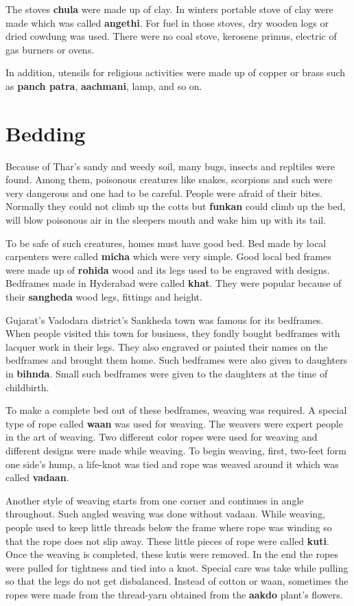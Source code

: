 The stoves \textbf{chula} were made up of clay. In winters portable stove of
clay were made which was called \textbf{angethi}. For fuel in those stoves, dry
wooden logs or dried cowdung was used. There were no coal stove, kerosene
primus, electric of gas burners or ovens.

In addition, utensils for religious activities were made up of copper or brass
such as \textbf{panch patra}, \textbf{aachmani}, lamp, and so on.

\section{Bedding}
Because of Thar's sandy and weedy soil, many bugs, insects and repltiles were
found. Among them, poisonous creatures like snakes, scorpions and such were very
dangerous and one had to be careful. People were afraid of their bites. Normally
they could not climb up the cotts but \textbf{funkan} could climb up the bed,
will blow poisonous air in the sleepers mouth and wake him up with its tail.

To be safe of such creatures, homes must have good bed. Bed made by local
carpenters were called \textbf{micha} which were very simple. Good local bed
frames were made up of \textbf{rohida} wood and its legs used to be engraved with
designs. Bedframes made in Hyderabad were called \textbf{khat}. They were popular
because of their \textbf{sangheda} wood legs, fittings and height.

Gujarat's Vadodara district's Sankheda town was famous for its bedframes. When
people visited this town for business, they fondly bought bedframes with lacquer
work in their legs. They also engraved or painted their names on the bedframes and
brought them home. Such bedframes were also given to daughters in \textbf{bihnda}.
Small such bedframes were given to the daughters at the time of childbirth.

To make a complete bed out of these bedframes, weaving was required. A special
type of rope called \textbf{waan} was used for weaving. The weavers were expert
people in the art of weaving. Two different color ropes were used for weaving
and different designs were made while weaving. To begin weaving, first, two-feet form one
side's hump, a life-knot was tied and rope was weaved around it which was called
\textbf{vadaan}.

Another style of  weaving starts from one corner and continues in angle throughout. Such
angled weaving was done without vadaan. While weaving, people used to keep
little threads below the frame where rope was winding so that the rope does not
slip away. These little pieces of rope were called \textbf{kuti}. Once the
weaving is completed, these kutis were removed. In the end the ropes were pulled
for tightness and tied into a knot. Special care was take while pulling so that
the legs do not get disbalanced. Instead of cotton or waan, sometimes the ropes
were made from the thread-yarn obtained from the \textbf{aakdo} plant's flowers.

